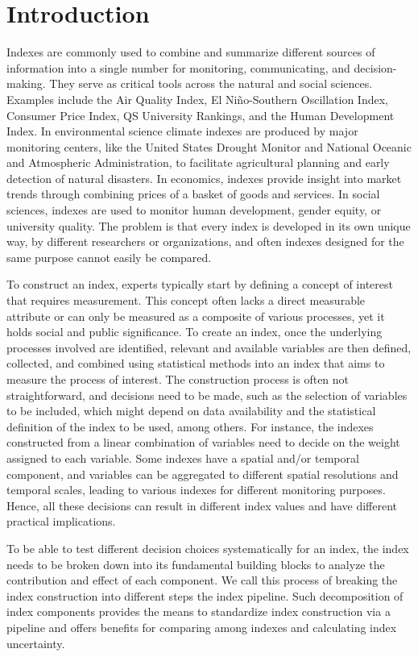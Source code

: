 \documentclass[
]{interact}
\begin{document}
\hypertarget{introduction}{%
\section{Introduction}\label{introduction}}

Indexes are commonly used to combine and summarize different sources of
information into a single number for monitoring, communicating, and
decision-making. They serve as critical tools across the natural and
social sciences. Examples include the Air Quality Index, El
Niño-Southern Oscillation Index, Consumer Price Index, QS University
Rankings, and the Human Development Index. In environmental science
climate indexes are produced by major monitoring centers, like the
United States Drought Monitor and National Oceanic and Atmospheric
Administration, to facilitate agricultural planning and early detection
of natural disasters. In economics, indexes provide insight into market
trends through combining prices of a basket of goods and services. In
social sciences, indexes are used to monitor human development, gender
equity, or university quality. The problem is that every index is
developed in its own unique way, by different researchers or
organizations, and often indexes designed for the same purpose cannot
easily be compared.

To construct an index, experts typically start by defining a concept of
interest that requires measurement. This concept often lacks a direct
measurable attribute or can only be measured as a composite of various
processes, yet it holds social and public significance. To create an
index, once the underlying processes involved are identified, relevant
and available variables are then defined, collected, and combined using
statistical methods into an index that aims to measure the process of
interest. The construction process is often not straightforward, and
decisions need to be made, such as the selection of variables to be
included, which might depend on data availability and the statistical
definition of the index to be used, among others. For instance, the
indexes constructed from a linear combination of variables need to
decide on the weight assigned to each variable. Some indexes have a
spatial and/or temporal component, and variables can be aggregated to
different spatial resolutions and temporal scales, leading to various
indexes for different monitoring purposes. Hence, all these decisions
can result in different index values and have different practical
implications.

To be able to test different decision choices systematically for an
index, the index needs to be broken down into its fundamental building
blocks to analyze the contribution and effect of each component. We call
this process of breaking the index construction into different steps the
index pipeline. Such decomposition of index components provides the
means to standardize index construction via a pipeline and offers
benefits for comparing among indexes and calculating index uncertainty.
\end{document}
